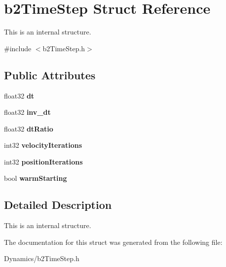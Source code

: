 \hypertarget{structb2TimeStep}{}\section{b2\+Time\+Step Struct Reference}
\label{structb2TimeStep}


This is an internal structure.  




{\ttfamily \#include $<$b2\+Time\+Step.\+h$>$}

\subsection*{Public Attributes}
\begin{DoxyCompactItemize}
\item 
\mbox{\label{structb2TimeStep_a74e20836809accba98a4445fbcb3427c}} 
float32 {\bfseries dt}
\item 
\mbox{\label{structb2TimeStep_ac2d652bde6d303149db9d0a461bc22ba}} 
float32 {\bfseries inv\+\_\+dt}
\item 
\mbox{\label{structb2TimeStep_aa67bc8a12ffafce918d9e6a0d8d3f203}} 
float32 {\bfseries dt\+Ratio}
\item 
\mbox{\label{structb2TimeStep_a9f2a0ccd8029681f254003b66f201ce1}} 
int32 {\bfseries velocity\+Iterations}
\item 
\mbox{\label{structb2TimeStep_ab7938eec17a1a3d7961d8364e150f1be}} 
int32 {\bfseries position\+Iterations}
\item 
\mbox{\label{structb2TimeStep_add80f7f86c84f005ad817f0313df3f32}} 
bool {\bfseries warm\+Starting}
\end{DoxyCompactItemize}


\subsection{Detailed Description}
This is an internal structure. 

The documentation for this struct was generated from the following file\+:\begin{DoxyCompactItemize}
\item 
Dynamics/b2\+Time\+Step.\+h\end{DoxyCompactItemize}
